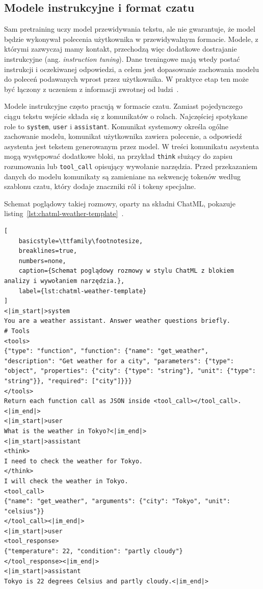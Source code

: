 \subsection{Modele instrukcyjne i format czatu}

Sam pretraining uczy model przewidywania tekstu, ale nie gwarantuje, że model
będzie wykonywał polecenia użytkownika w przewidywalnym formacie. Modele, z
którymi zazwyczaj mamy kontakt, przechodzą więc dodatkowe dostrajanie
instrukcyjne (ang. \emph{instruction tuning}). Dane treningowe mają wtedy postać instrukcji i
oczekiwanej odpowiedzi, a celem jest dopasowanie zachowania modelu do poleceń
podawanych wprost przez użytkownika. W praktyce etap ten może być łączony z
uczeniem z informacji zwrotnej od ludzi~\autocite{ouyang-instruction-following}.

Modele instrukcyjne często pracują w formacie czatu. Zamiast pojedynczego ciągu
tekstu wejście składa się z komunikatów o rolach. Najczęściej spotykane role to
\texttt{system}, \texttt{user} i \texttt{assistant}. Komunikat systemowy
określa ogólne zachowanie modelu, komunikat użytkownika zawiera polecenie, a
odpowiedź asystenta jest tekstem generowanym przez model. W treści komunikatu
asystenta mogą występować dodatkowe bloki, na przykład \texttt{think} służący
do zapisu rozumowania lub \texttt{tool\_call} opisujący wywołanie narzędzia.
Przed przekazaniem danych do modelu komunikaty
są zamieniane na sekwencję tokenów według szablonu czatu, który dodaje
znaczniki ról i tokeny specjalne.

Schemat poglądowy takiej rozmowy, oparty na składni ChatML, pokazuje
listing~\ref{lst:chatml-weather-template}~\autocite{qwen3-06b-model-card}.

\begin{lstlisting}[
    basicstyle=\ttfamily\footnotesize,
    breaklines=true,
    numbers=none,
    caption={Schemat poglądowy rozmowy w stylu ChatML z blokiem analizy i wywołaniem narzędzia.},
    label={lst:chatml-weather-template}
]
<|im_start|>system
You are a weather assistant. Answer weather questions briefly.
# Tools
<tools>
{"type": "function", "function": {"name": "get_weather", "description": "Get weather for a city", "parameters": {"type": "object", "properties": {"city": {"type": "string"}, "unit": {"type": "string"}}, "required": ["city"]}}}
</tools>
Return each function call as JSON inside <tool_call></tool_call>.
<|im_end|>
<|im_start|>user
What is the weather in Tokyo?<|im_end|>
<|im_start|>assistant
<think>
I need to check the weather for Tokyo.
</think>
I will check the weather in Tokyo.
<tool_call>
{"name": "get_weather", "arguments": {"city": "Tokyo", "unit": "celsius"}}
</tool_call><|im_end|>
<|im_start|>user
<tool_response>
{"temperature": 22, "condition": "partly cloudy"}
</tool_response><|im_end|>
<|im_start|>assistant
Tokyo is 22 degrees Celsius and partly cloudy.<|im_end|>
\end{lstlisting}

